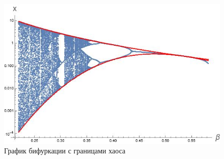 \documentclass[14pt]{extarticle}
\begin{document}
        \begin{figure}[h]
            \centering
            \includegraphics[width=\textwidth]{images/bifurcation_chaos.jpg}
            \caption{График бифуркации с границами хаоса}
        \end{figure}
\end{document}
